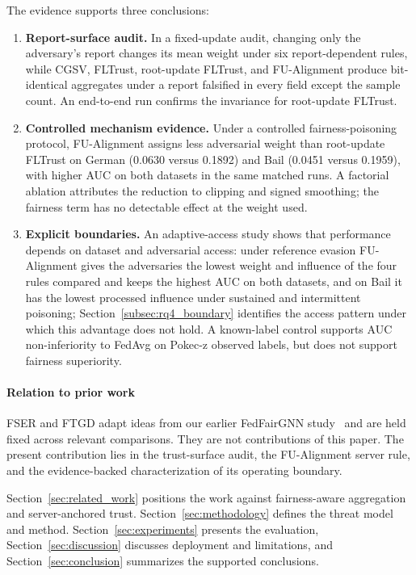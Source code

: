 The evidence supports three conclusions:
\begin{enumerate}[leftmargin=*]
    \item \textbf{Report-surface audit.} In a fixed-update audit, changing only the adversary's report changes its mean weight under six report-dependent rules, while CGSV, FLTrust, root-update FLTrust, and FU-Alignment produce bit-identical aggregates under a report falsified in every field except the sample count. An end-to-end run confirms the invariance for root-update FLTrust.
    \item \textbf{Controlled mechanism evidence.} Under a controlled fairness-poisoning protocol, FU-Alignment assigns less adversarial weight than root-update FLTrust on German (0.0630 versus 0.1892) and Bail (0.0451 versus 0.1959), with higher AUC on both datasets in the same matched runs. A factorial ablation attributes the reduction to clipping and signed smoothing; the fairness term has no detectable effect at the weight used.
    \item \textbf{Explicit boundaries.} An adaptive-access study shows that performance depends on dataset and adversarial access: under reference evasion FU-Alignment gives the adversaries the lowest weight and influence of the four rules compared and keeps the highest AUC on both datasets, and on Bail it has the lowest processed influence under sustained and intermittent poisoning; Section~\ref{subsec:rq4_boundary} identifies the access pattern under which this advantage does not hold. A known-label control supports AUC non-inferiority to FedAvg on Pokec-z observed labels, but does not support fairness superiority.
\end{enumerate}

\paragraph{Relation to prior work}
FSER and FTGD adapt ideas from our earlier FedFairGNN study~\citep{dang2026fedfairgnn} and are held fixed across relevant comparisons. They are not contributions of this paper. The present contribution lies in the trust-surface audit, the FU-Alignment server rule, and the evidence-backed characterization of its operating boundary.

Section~\ref{sec:related_work} positions the work against fairness-aware aggregation and server-anchored trust. Section~\ref{sec:methodology} defines the threat model and method. Section~\ref{sec:experiments} presents the evaluation, Section~\ref{sec:discussion} discusses deployment and limitations, and Section~\ref{sec:conclusion} summarizes the supported conclusions.
